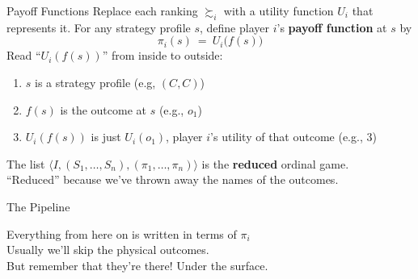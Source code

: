 
\begin{frame}{Payoff Functions}
Replace each ranking $\succsim_i$ with a utility function $U_i$ that represents it.
\bsk
For any strategy profile $s$, define player $i$'s \textbf{payoff function} at $s$ by
$$\pi_i(s)\ =\ U_i\big(f(s)\big)$$
\bsk
Read ``$U_i(f(s))$'' from inside to outside:
\begin{enumerate}
    \item $s$ is a strategy profile (e.g, $(C,C)$)
    \item $f(s)$ is the outcome at $s$ (e.g., $o_1$)
    \item $U_i(f(s))$ is just $U_i(o_1)$, player $i$'s utility of that outcome (e.g., 3)
\end{enumerate}
\vfill
The list $\langle I,(S_1,\ldots,S_n),(\pi_1,\ldots,\pi_n)\rangle$ is the
\textbf{reduced} ordinal game.\\
``Reduced'' because we've thrown away the names of the outcomes.
\vspace{-0.3in}
\end{frame}

\begin{frame}{The Pipeline}
\centering
\bsk
{}
\bsk
\raggedright
\vfill
Everything from here on is written in terms of $\pi_i$\\
Usually we'll skip the physical outcomes.\\
But remember that they're there! Under the surface.
\vspace{-0.4in}
\end{frame}

